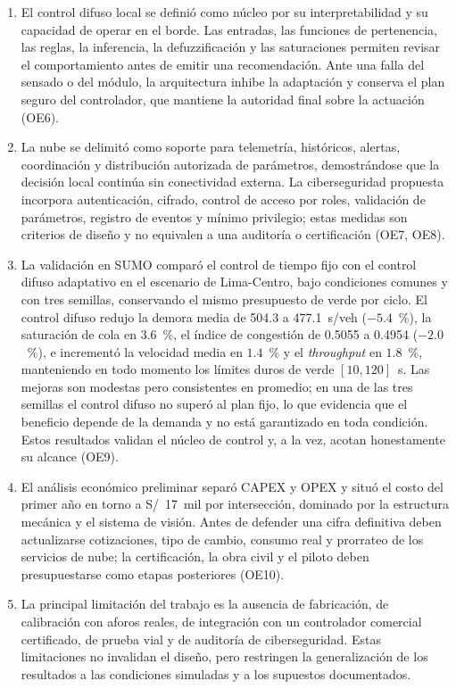 \begin{enumerate}
\item El control difuso local se definió como núcleo por su interpretabilidad y su capacidad de operar en el
borde. Las entradas, las funciones de pertenencia, las reglas, la inferencia, la defuzzificación y las
saturaciones permiten revisar el comportamiento antes de emitir una recomendación. Ante una falla del
sensado o del módulo, la arquitectura inhibe la adaptación y conserva el plan seguro del controlador, que
mantiene la autoridad final sobre la actuación (OE6).

\item La nube se delimitó como soporte para telemetría, históricos, alertas, coordinación y distribución
autorizada de parámetros, demostrándose que la decisión local continúa sin conectividad externa. La
ciberseguridad propuesta incorpora autenticación, cifrado, control de acceso por roles, validación de
parámetros, registro de eventos y mínimo privilegio; estas medidas son criterios de diseño y no equivalen a
una auditoría o certificación (OE7, OE8).

\item La validación en SUMO comparó el control de tiempo fijo con el control difuso adaptativo en el
escenario de Lima-Centro, bajo condiciones comunes y con tres semillas, conservando el mismo presupuesto de
verde por ciclo. El control difuso redujo la demora media de 504.3 a 477.1~s/veh ($-5.4$~\%), la saturación
de cola en $3.6$~\%, el índice de congestión de 0.5055 a 0.4954 ($-2.0$~\%), e incrementó la velocidad media
en $1.4$~\% y el \textit{throughput} en $1.8$~\%, manteniendo en todo momento los límites duros de verde
$[10,120]$~s. Las mejoras son modestas pero consistentes en promedio; en una de las tres semillas el control
difuso no superó al plan fijo, lo que evidencia que el beneficio depende de la demanda y no está garantizado
en toda condición. Estos resultados validan el núcleo de control y, a la vez, acotan honestamente su alcance
(OE9).

\item El análisis económico preliminar separó CAPEX y OPEX y situó el costo del primer año en torno a
S/~17~mil por intersección, dominado por la estructura mecánica y el sistema de visión. Antes de defender
una cifra definitiva deben actualizarse cotizaciones, tipo de cambio, consumo real y prorrateo de los
servicios de nube; la certificación, la obra civil y el piloto deben presupuestarse como etapas posteriores
(OE10).

\item La principal limitación del trabajo es la ausencia de fabricación, de calibración con aforos reales,
de integración con un controlador comercial certificado, de prueba vial y de auditoría de ciberseguridad.
Estas limitaciones no invalidan el diseño, pero restringen la generalización de los resultados a las
condiciones simuladas y a los supuestos documentados.


\end{enumerate}
